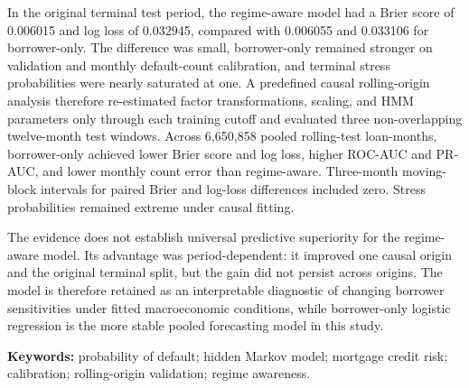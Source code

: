 In the original terminal test period, the regime-aware model had a Brier score of 0.006015 and log loss of 0.032945, compared with 0.006055 and 0.033106 for borrower-only. The difference was small, borrower-only remained stronger on validation and monthly default-count calibration, and terminal stress probabilities were nearly saturated at one. A predefined causal rolling-origin analysis therefore re-estimated factor transformations, scaling, and HMM parameters only through each training cutoff and evaluated three non-overlapping twelve-month test windows. Across 6,650,858 pooled rolling-test loan-months, borrower-only achieved lower Brier score and log loss, higher ROC-AUC and PR-AUC, and lower monthly count error than regime-aware. Three-month moving-block intervals for paired Brier and log-loss differences included zero. Stress probabilities remained extreme under causal fitting.

The evidence does not establish universal predictive superiority for the regime-aware model. Its advantage was period-dependent: it improved one causal origin and the original terminal split, but the gain did not persist across origins. The model is therefore retained as an interpretable diagnostic of changing borrower sensitivities under fitted macroeconomic conditions, while borrower-only logistic regression is the more stable pooled forecasting model in this study.

\noindent\textbf{Keywords:} probability of default; hidden Markov model; mortgage credit risk; calibration; rolling-origin validation; regime awareness.

\clearpage
\begingroup
\footnotesize
\tableofcontents
\clearpage
\listoftables
\clearpage
\listoffigures
\endgroup

\clearpage
